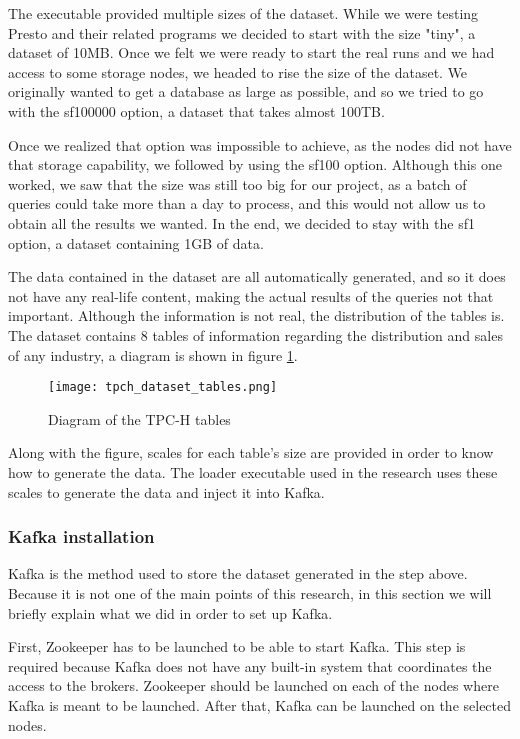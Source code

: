 \documentclass[conference]{IEEEtran}
\begin{document}
The executable provided multiple sizes of the dataset. While we were testing Presto and their related programs we decided to start with the size "tiny", a dataset of 10MB. Once we felt we were ready to start the real runs and we had access to some storage nodes, we headed to rise the size of the dataset. We originally wanted to get a database as large as possible, and so we tried to go with the sf100000 option, a dataset that takes almost 100TB.

Once we realized that option was impossible to achieve, as the nodes did not have that storage capability, we followed by using the sf100 option. Although this one worked, we saw that the size was still too big for our project, as a batch of queries could take more than a day to process, and this would not allow us to obtain all the results we wanted. In the end, we decided to stay with the sf1 option, a dataset containing 1GB of data.

The data contained in the dataset are all automatically generated, and so it does not have any real-life content, making the actual results of the queries not that important. Although the information is not real, the distribution of the tables is. The dataset contains 8 tables of information regarding the distribution and sales of any industry, a diagram is shown in figure \ref{tpch_dataset_diagram}.

\begin{figure}[htbp]
\centerline{\texttt{[image: tpch\_dataset\_tables.png]}}
\caption{Diagram of the TPC-H tables}
\label{tpch_dataset_diagram}
\end{figure}

Along with the figure, scales for each table's size are provided in order to know how to generate the data. The loader executable used in the research uses these scales to generate the data and inject it into Kafka.

\subsubsection{Kafka installation}
Kafka is the method used to store the dataset generated in the step above. Because it is not one of the main points of this research, in this section we will briefly explain what we did in order to set up Kafka.

First, Zookeeper has to be launched to be able to start Kafka. This step is required because Kafka does not have any built-in system that coordinates the access to the brokers. Zookeeper should be launched on each of the nodes where Kafka is meant to be launched.
After that, Kafka can be launched on the selected nodes.
\end{document}
